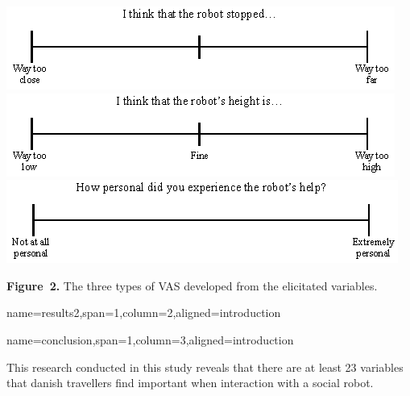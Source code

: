 \documentclass[paperwidth=160cm,paperheight=100cm,landscape,fontscale=0.3010]{baposter}
\begin{document}
\begin{poster}
{\begin{center}
	\includegraphics[width=0.4\linewidth]{RStopped.eps}
	\includegraphics[width=0.4\linewidth]{RobotHeight.eps}
	\includegraphics[width=0.4\linewidth]{PersonalHelp.eps}

	\textbf{Figure~2. }The three types of VAS developed from the elicitated variables.
\end{center}
\vspace{-10pt}
}



{name=results2,span=1,column=2,aligned=introduction}
{\parskip 5pt


}


{name=conclusion,span=1,column=3,aligned=introduction}
{\parskip 5pt
This research conducted in this study reveals that there are at least 23 variables that danish travellers find important when interaction with a social robot. 


}
\end{poster}
\end{document}
